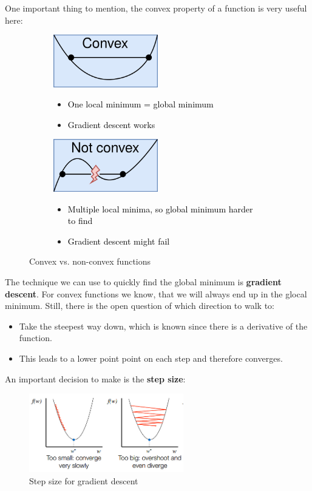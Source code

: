 One important thing to mention, the convex property of a function is very useful here:
\begin{figure}[H]
  \centering
  \begin{subfigure}{0.45\textwidth}
    \centering
    \includegraphics[width=0.5\textwidth]{assets/regression/sr__convex.png}
    \begin{itemize}
      \item \textcolor{black}{One local minimum = global minimum}
      \item \textcolor{black}{Gradient descent works}
    \end{itemize}
  \end{subfigure}\hspace*{0.05\textwidth}
  \begin{subfigure}{0.45\textwidth}
    \centering
    \includegraphics[width=0.5\textwidth]{assets/regression/sr__nonconvex.png}
    \begin{itemize}
      \item \textcolor{black}{Multiple local minima, so global minimum harder to find}
      \item \textcolor{black}{Gradient descent might fail}
    \end{itemize}
  \end{subfigure}
  \caption{Convex vs. non-convex functions}
  \label{fig:4_conv_vs_nonconv}
\end{figure}

The technique we can use to quickly find the global minimum is \textbf{gradient descent}. For convex functions we know, that we will always end up in the glocal minimum. Still, there is the open question of which direction to walk to:
\begin{itemize}
  \item Take the steepest way down, which is known since there is a derivative of the function.
  \item This leads to a lower point point on each step and therefore converges.
\end{itemize}

An important decision to make is the \textbf{step size}:
\begin{figure}[H]
  \centering
  \includegraphics[width=0.6\textwidth]{assets/regression/sr__learning_rate.jpg} 
  \caption{Step size for gradient descent}
  \label{fig:4_learning_rate}
\end{figure}
